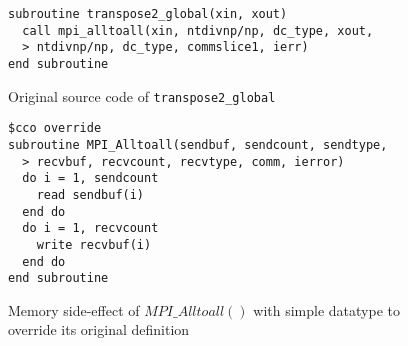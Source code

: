 \begin{figure}[h]
{\scriptsize
\begin{verbatim}
subroutine transpose2_global(xin, xout)
  call mpi_alltoall(xin, ntdivnp/np, dc_type, xout,
  > ntdivnp/np, dc_type, commslice1, ierr)
end subroutine
\end{verbatim}
}%
\caption{Original source code of \texttt{transpose2\_global}}
\label{fig:code:transpose2}
\end{figure}

%
%

\begin{figure}[h]
{\scriptsize
\begin{verbatim}
$cco override
subroutine MPI_Alltoall(sendbuf, sendcount, sendtype,
  > recvbuf, recvcount, recvtype, comm, ierror)
  do i = 1, sendcount
    read sendbuf(i)
  end do
  do i = 1, recvcount
    write recvbuf(i)
  end do
end subroutine
\end{verbatim}
}%
\caption{Memory side-effect of $MPI\_Alltoall()$ with simple datatype to override its original definition}
\label{fig:annot:a2a}
\end{figure}



